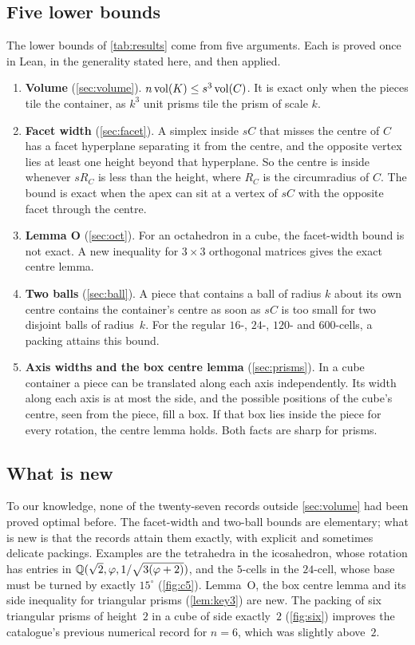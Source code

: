 \documentclass[11pt,a4paper]{article}
\begin{document}
\subsection{Five lower bounds}
The lower bounds of \cref{tab:results} come from five arguments. Each is proved once in Lean, in the generality stated here, and then applied.
\begin{enumerate}
\item \textbf{Volume} (\cref{sec:volume}). $n\operatorname{vol}(K)\le s^3\operatorname{vol}(C)$. It is exact only when the pieces tile the container, as $k^3$ unit prisms tile the prism of scale $k$.
\item \textbf{Facet width} (\cref{sec:facet}). A simplex inside $sC$ that misses the centre of $C$ has a facet hyperplane separating it from the centre, and the opposite vertex lies at least one height beyond that hyperplane. So the centre is inside whenever $sR_C$ is less than the height, where $R_C$ is the circumradius of $C$. The bound is exact when the apex can sit at a vertex of $sC$ with the opposite facet through the centre.
\item \textbf{Lemma O} (\cref{sec:oct}). For an octahedron in a cube, the facet-width bound is not exact. A new inequality for $3\times3$ orthogonal matrices gives the exact centre lemma.
\item \textbf{Two balls} (\cref{sec:ball}). A piece that contains a ball of radius $k$ about its own centre contains the container's centre as soon as $sC$ is too small for two disjoint balls of radius~$k$. For the regular $16$-, $24$-, $120$- and $600$-cells, a packing attains this bound.
\item \textbf{Axis widths and the box centre lemma} (\cref{sec:prisms}). In a cube container a piece can be translated along each axis independently. Its width along each axis is at most the side, and the possible positions of the cube's centre, seen from the piece, fill a box. If that box lies inside the piece for every rotation, the centre lemma holds. Both facts are sharp for prisms.
\end{enumerate}

\subsection{What is new}
To our knowledge, none of the twenty-seven records outside \cref{sec:volume} had been proved optimal before. The facet-width and two-ball bounds are elementary; what is new is that the records attain them exactly, with explicit and sometimes delicate packings. Examples are the tetrahedra in the icosahedron, whose rotation has entries in $\mathbb Q(\sqrt2,\varphi,1/\sqrt{3(\varphi+2)})$, and the $5$-cells in the $24$-cell, whose base must be turned by exactly $15^\circ$ (\cref{fig:c5}). Lemma~O, the box centre lemma and its side inequality for triangular prisms (\cref{lem:key3}) are new. The packing of six triangular prisms of height~$2$ in a cube of side exactly~$2$ (\cref{fig:six}) improves the catalogue's previous numerical record for $n=6$, which was slightly above~$2$.
\end{document}
